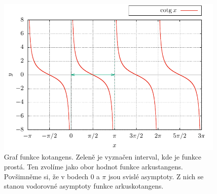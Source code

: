\begin{figure}[H]
    \centering
    \includegraphics{Gnuplot/cv1/Figures/kotangensgraf.pdf}
    \caption{Graf funkce kotangens. Zeleně je vyznačen interval, kde je funkce prostá. Ten zvolíme jako obor hodnot funkce arkustangens. Povšimněme si, že v bodech $0$ a $\pi$ jsou svislé asymptoty. Z nich se stanou vodorovné asymptoty funkce arkuskotangens.}
    \label{fig:kotangens}
\end{figure}

